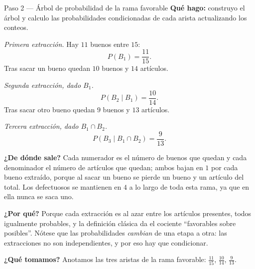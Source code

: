 \documentclass[11pt]{article}
\begin{document}
\begin{paso}{Paso 2 --- Árbol de probabilidad de la rama favorable}
\textbf{Qué hago:} construyo el árbol y calculo las probabilidades condicionadas de cada arista actualizando los conteos.

\emph{Primera extracción.} Hay $11$ buenos entre $15$:
\[
P(B_1)=\frac{11}{15}.
\]
Tras sacar un bueno quedan $10$ buenos y $14$ artículos.

\emph{Segunda extracción, dado $B_1$.}
\[
P(B_2\mid B_1)=\frac{10}{14}.
\]
Tras sacar otro bueno quedan $9$ buenos y $13$ artículos.

\emph{Tercera extracción, dado $B_1\cap B_2$.}
\[
P(B_3\mid B_1\cap B_2)=\frac{9}{13}.
\]

\begin{center}
\end{center}

\textbf{¿De dónde sale?} Cada numerador es el número de buenos que quedan y cada denominador el número de artículos que quedan; ambos bajan en $1$ por cada bueno extraído, porque al sacar un bueno se pierde un bueno y un artículo del total. Los defectuosos se mantienen en $4$ a lo largo de toda esta rama, ya que en ella nunca se saca uno.

\textbf{¿Por qué?} Porque cada extracción es al azar entre los artículos presentes, todos igualmente probables, y la definición clásica da el cociente ``favorables sobre posibles''. Nótese que las probabilidades \emph{cambian} de una etapa a otra: las extracciones no son independientes, y por eso hay que condicionar.

\textbf{¿Qué tomamos?} Anotamos las tres aristas de la rama favorable: $\tfrac{11}{15}$, $\tfrac{10}{14}$, $\tfrac{9}{13}$.
\end{paso}
\end{document}
